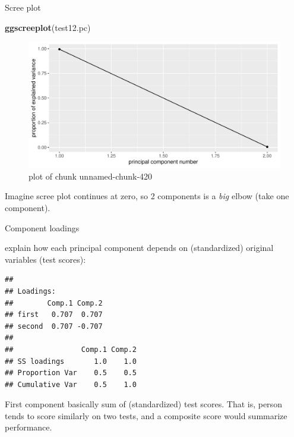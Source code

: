 \documentclass[ignorenonframetext,]{beamer}
\newenvironment{Shaded}{\begin{snugshade}}{\end{snugshade}}
\newcommand{\KeywordTok}[1]{\textcolor[rgb]{0.13,0.29,0.53}{\textbf{#1}}}
\newcommand{\NormalTok}[1]{#1}
\newcommand{\OperatorTok}[1]{\textcolor[rgb]{0.81,0.36,0.00}{\textbf{#1}}}
\begin{document}
\begin{frame}[fragile]{Scree plot}
\protect\hypertarget{scree-plot-1}{}

\begin{Shaded}
\begin{Highlighting}[]
\KeywordTok{ggscreeplot}\NormalTok{(test12.pc)}
\end{Highlighting}
\end{Shaded}

\begin{figure}
\centering
\includegraphics{figure/unnamed-chunk-420-1.pdf}
\caption{plot of chunk unnamed-chunk-420}
\end{figure}

Imagine scree plot continues at zero, so 2 components is a \emph{big}
elbow (take one component).

\end{frame}

\begin{frame}[fragile]{Component loadings}
\protect\hypertarget{component-loadings}{}

explain how each principal component depends on (standardized) original
variables (test scores):

\footnotesize

\begin{Shaded}
\end{Shaded}

\begin{verbatim}
## 
## Loadings:
##        Comp.1 Comp.2
## first   0.707  0.707
## second  0.707 -0.707
## 
##                Comp.1 Comp.2
## SS loadings       1.0    1.0
## Proportion Var    0.5    0.5
## Cumulative Var    0.5    1.0
\end{verbatim}

\normalsize

First component basically sum of (standardized) test scores. That is,
person tends to score similarly on two tests, and a composite score
would summarize performance.

\end{frame}
\end{document}
